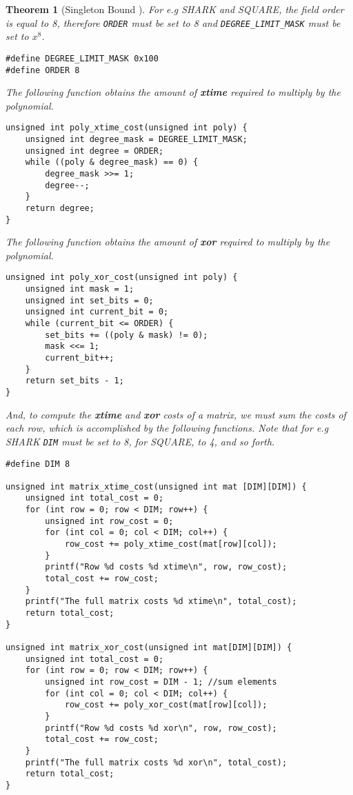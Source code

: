 \documentclass{report}
\newtheorem{theorem}{Theorem}{\bfseries}{\itshape}
\begin{document}
\begin{theorem}[Singleton Bound \cite{SloaneBook}]
For e.g SHARK and SQUARE, the field order is equal to 8, therefore \texttt{ORDER} must be set to 8 and \texttt{DEGREE_LIMIT_MASK} must be set to $x^8$.

\begin{verbatim}
#define DEGREE_LIMIT_MASK 0x100
#define ORDER 8
\end{verbatim}

The following function obtains the amount of \textbf{xtime} required to multiply by the polynomial.

\begin{verbatim}
unsigned int poly_xtime_cost(unsigned int poly) {
	unsigned int degree_mask = DEGREE_LIMIT_MASK;
	unsigned int degree = ORDER;
	while ((poly & degree_mask) == 0) {
		degree_mask >>= 1;
		degree--;
	}
	return degree;
}
\end{verbatim}

The following function obtains the amount of \textbf{xor} required to multiply by the polynomial.
\begin{verbatim}
unsigned int poly_xor_cost(unsigned int poly) {
	unsigned int mask = 1;
	unsigned int set_bits = 0;
	unsigned int current_bit = 0;
	while (current_bit <= ORDER) {
		set_bits += ((poly & mask) != 0);
		mask <<= 1;
		current_bit++;
	}
	return set_bits - 1;
}
\end{verbatim}

And, to compute the \textbf{xtime} and \textbf{xor} costs of a matrix, we must sum the costs of each row, which is accomplished by the following functions. Note that for e.g SHARK \texttt{DIM} must be set to 8, for SQUARE, to 4, and so forth.

\begin{verbatim}
#define DIM 8

unsigned int matrix_xtime_cost(unsigned int mat [DIM][DIM]) {
	unsigned int total_cost = 0;
	for (int row = 0; row < DIM; row++) {
		unsigned int row_cost = 0;
		for (int col = 0; col < DIM; col++) {
			row_cost += poly_xtime_cost(mat[row][col]);
		}
		printf("Row %d costs %d xtime\n", row, row_cost);
		total_cost += row_cost;
	}
	printf("The full matrix costs %d xtime\n", total_cost);
	return total_cost;
}

unsigned int matrix_xor_cost(unsigned int mat[DIM][DIM]) {
	unsigned int total_cost = 0;
	for (int row = 0; row < DIM; row++) {
		unsigned int row_cost = DIM - 1; //sum elements
		for (int col = 0; col < DIM; col++) {
			row_cost += poly_xor_cost(mat[row][col]);
		}
		printf("Row %d costs %d xor\n", row, row_cost);
		total_cost += row_cost;
	}
	printf("The full matrix costs %d xor\n", total_cost);
	return total_cost;
}
\end{verbatim}


\end{theorem}
\end{document}

